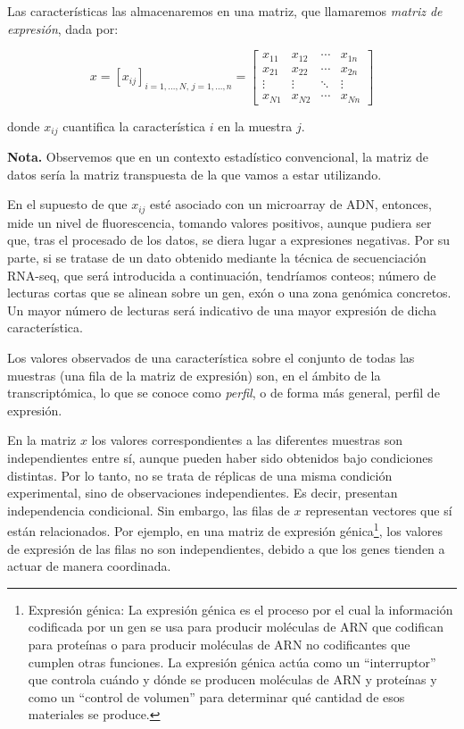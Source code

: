 Las características las almacenaremos en una matriz, que llamaremos \textit{matriz de expresión}, dada por:

\[
x = [x_{ij}]_{i=1,\dots,N,\, j=1,\dots,n} =
\begin{bmatrix}
x_{11} & x_{12} & \cdots & x_{1n} \\
x_{21} & x_{22} & \cdots & x_{2n} \\
\vdots & \vdots & \ddots & \vdots \\
x_{N1} & x_{N2} & \cdots & x_{Nn}
\end{bmatrix}
\]


donde $x_{ij}$ cuantifica la característica $i$ en la muestra $j$. \newline

\textbf{Nota.} Observemos que en un contexto estadístico
convencional, la matriz de datos sería la matriz transpuesta de la que vamos a estar utilizando. \newline

En el supuesto de que $x_{ij}$ esté asociado con un microarray de ADN, entonces, mide un nivel de fluorescencia,
tomando valores positivos, aunque pudiera ser que, tras el procesado de los datos, se diera lugar a expresiones 
negativas. Por su parte, si se tratase de un dato obtenido mediante la técnica de secuenciación RNA-seq, que será introducida a continuación, tendríamos conteos; 
número de lecturas cortas que se alinean sobre un gen, exón o una zona genómica concretos. Un mayor número de
lecturas será indicativo de una mayor expresión de dicha característica. \newline

Los valores observados de una característica sobre el conjunto de todas las muestras (una fila de la matriz de
expresión) son, en el ámbito de la transcriptómica, lo que se conoce como \textit{perfil}, o de forma más general,
perfil de expresión. \newline

En la matriz $x$ los valores correspondientes a las diferentes muestras son independientes entre sí, aunque pueden
haber sido obtenidos bajo condiciones distintas. Por lo tanto, no se trata de réplicas de una misma condición
experimental, sino de observaciones independientes. Es decir, presentan independencia condicional. Sin embargo, las
filas de $x$ representan vectores que sí están relacionados. Por ejemplo, en una matriz de expresión génica\footnote[5]{Expresión génica: 
La expresión génica es el proceso por el cual la información codificada por un gen se usa 
para producir moléculas de ARN que codifican para proteínas o para producir moléculas de ARN no codificantes que cumplen otras funciones. La expresión génica
actúa como un “interruptor” que controla cuándo y dónde se producen moléculas de ARN y proteínas y como un “control de volumen” para determinar qué cantidad
de esos materiales se produce\cite{expresion-genica-definition}.}, los 
valores de expresión de las filas no son independientes, debido a que los genes tienden a actuar de manera coordinada. \newline

